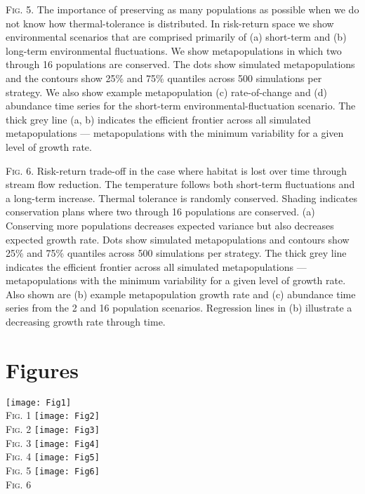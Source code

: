 \documentclass[12pt,english]{article}
\begin{document}
\begin{spacing}{1.9}

\bigskip
\noindent
\textsc{Fig. 5}. The importance of preserving as many populations as possible when we do not know how thermal-tolerance is distributed. In risk-return space we show environmental scenarios that are comprised primarily of (a) short-term and (b) long-term environmental fluctuations. We show metapopulations in which two through 16 populations are conserved. The dots show simulated metapopulations and the contours show 25\% and 75\% quantiles across 500 simulations per strategy. We also show example metapopulation (c) rate-of-change and (d) abundance time series for the short-term environmental-fluctuation scenario. The thick grey line (a, b) indicates the efficient frontier across all simulated metapopulations --- metapopulations with the minimum variability for a given level of growth rate.

\bigskip
\noindent
\textsc{Fig. 6}. Risk-return trade-off in the case where habitat is lost over time through stream flow reduction. The temperature follows both short-term fluctuations and a long-term increase. Thermal tolerance is randomly conserved. Shading indicates conservation plans where two through 16 populations are conserved. (a) Conserving more populations decreases expected variance but also decreases expected growth rate. Dots show simulated metapopulations and contours show 25\% and 75\% quantiles across 500 simulations per strategy. The thick grey line indicates the efficient frontier across all simulated metapopulations --- metapopulations with the minimum variability for a given level of growth rate. Also shown are (b) example metapopulation growth rate and (c) abundance time series from the 2 and 16 population scenarios. Regression lines in (b) illustrate a decreasing growth rate through time.

\clearpage

\section{Figures}

\begin{center}
\texttt{[image: Fig1]}\\
\textsc{Fig.} 1
\clearpage
\texttt{[image: Fig2]}\\
\textsc{Fig.} 2
\clearpage
\texttt{[image: Fig3]}\\
\textsc{Fig.} 3
\clearpage
\texttt{[image: Fig4]}\\
\textsc{Fig.} 4
\clearpage
\texttt{[image: Fig5]}\\
\textsc{Fig.} 5
\clearpage
\texttt{[image: Fig6]}\\
\textsc{Fig.} 6
\clearpage
\end{center}

\end{spacing}


 \begin{spacing}{1.1}



 \end{spacing}
\end{document}
